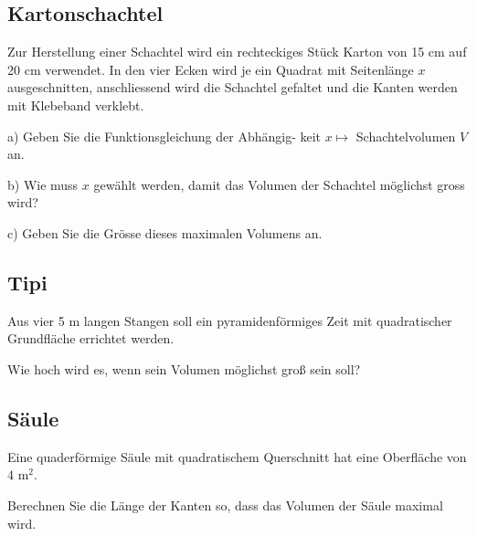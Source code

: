 \subsection{Kartonschachtel}
Zur Herstellung einer Schachtel wird ein rechteckiges
Stück Karton von 15 cm auf 20 cm verwendet. In
den vier Ecken wird je ein Quadrat mit Seitenlänge $x$
ausgeschnitten, anschliessend wird die Schachtel
gefaltet und die Kanten werden mit Klebeband
verklebt.

a)
Geben Sie die Funktionsgleichung der Abhängig-
keit $x \mapsto$ Schachtelvolumen $V$ an.

b)
Wie muss $x$ gewählt werden, damit das Volumen
der Schachtel möglichst gross wird?

c)
Geben Sie die Grösse dieses maximalen Volumens
an.





\subsection{Tipi}

Aus vier 5 m langen Stangen soll ein
pyramidenförmiges Zeit mit quadratischer Grundfläche errichtet werden.

Wie hoch wird es, wenn sein Volumen möglichst groß sein soll?



\subsection{Säule}

Eine quaderförmige Säule mit quadratischem Querschnitt hat eine Oberfläche von $4 \text{ m}^2$.

Berechnen Sie die Länge der Kanten so, dass das Volumen der Säule
maximal wird.

